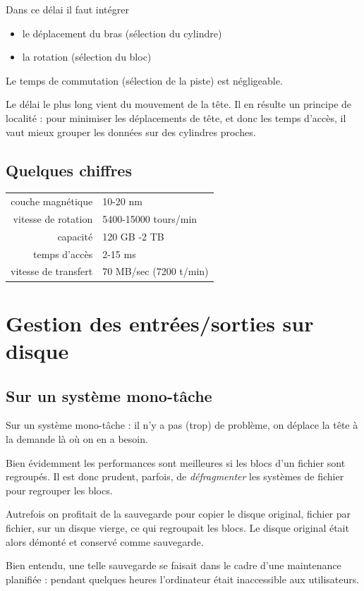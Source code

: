 \begin{multicols}{2}
Dans ce délai il faut intégrer
\begin{itemize}
\item le déplacement du bras (sélection du cylindre)
\item la rotation (sélection du bloc)
\end{itemize}
Le temps de commutation (sélection de la piste) est négligeable.

Le délai le plus long vient du mouvement de la tête.  Il en résulte un principe de localité : pour minimiser les déplacements de tête, et donc les temps d'accès, il vaut mieux grouper les données sur des cylindres proches.

\subsection{Quelques chiffres}


\begin{tabular}{rl}
couche magnétique & 10-20 nm \\
vitesse de rotation & 5400-15000 tours/min \\
capacité & 120 GB -2 TB \\
temps d'accès & 2-15 ms \\
vitesse de transfert & 70 MB/sec (7200 t/min) 
\end{tabular}


\section{Gestion des entrées/sorties sur disque}


\subsection{Sur un système mono-tâche}

Sur un système mono-tâche : il n'y a pas (trop) de problème,
on déplace la tête à la demande là où on en a besoin.

Bien évidemment les performances sont meilleures 
 si les blocs d'un fichier  sont regroupés.  Il est donc 
prudent, parfois, de \emph{défragmenter} les systèmes
de fichier pour regrouper les blocs.

Autrefois on profitait de la sauvegarde pour copier
le disque original, fichier par fichier, sur un disque vierge, 
ce qui regroupait les blocs. Le disque original était alors démonté
et conservé comme sauvegarde.

Bien entendu, une telle sauvegarde se faisait dans le cadre d'une
maintenance planifiée : pendant quelques heures l'ordinateur était
inaccessible aux utilisateurs.



\end{multicols}
